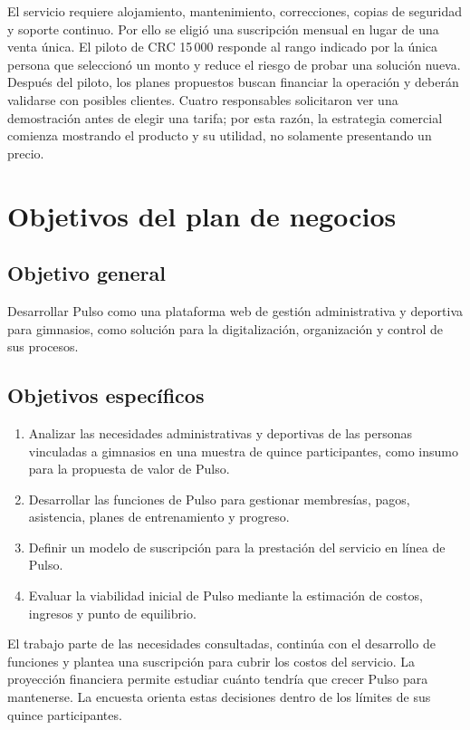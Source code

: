 El servicio requiere alojamiento, mantenimiento, correcciones, copias de
seguridad y soporte continuo. Por ello se eligió una suscripción mensual en lugar
de una venta única. El piloto de CRC 15\,000 responde al rango indicado por la
única persona que seleccionó un monto y reduce el riesgo de probar una solución
nueva. Después del piloto, los planes propuestos buscan financiar la operación y
deberán validarse con posibles clientes. Cuatro
responsables solicitaron ver una demostración antes de elegir una tarifa; por
esta razón, la estrategia comercial comienza mostrando el producto y su
utilidad, no solamente presentando un precio.

\section{Objetivos del plan de negocios}

\subsection{Objetivo general}

Desarrollar Pulso como una plataforma web de gestión administrativa y deportiva
para gimnasios, como solución para la digitalización, organización y control de
sus procesos.

\subsection{Objetivos específicos}

\begin{enumerate}
  \item Analizar las necesidades administrativas y deportivas de las personas vinculadas a gimnasios en una muestra de quince participantes, como insumo para la propuesta de valor de Pulso.

  \item Desarrollar las funciones de Pulso para gestionar membresías, pagos, asistencia, planes de entrenamiento y progreso.

  \item Definir un modelo de suscripción para la prestación del servicio en línea de Pulso.

  \item Evaluar la viabilidad inicial de Pulso mediante la estimación de costos, ingresos y punto de equilibrio.
\end{enumerate}

El trabajo parte de las necesidades consultadas, continúa con el desarrollo de
funciones y plantea una suscripción para cubrir los costos del servicio. La
proyección financiera permite estudiar cuánto tendría que crecer Pulso para
mantenerse. La encuesta orienta estas decisiones dentro de los límites de sus
quince participantes.
